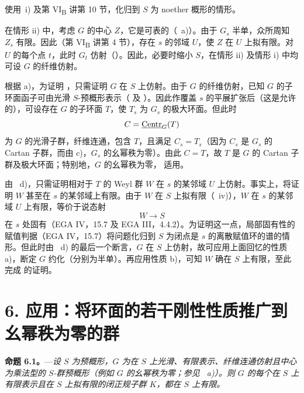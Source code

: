 使用~i) 及第 VI\textsubscript{B} 讲第 10 节，化归到 \(S\) 为 noether 概形的情形。

在情形 ii) 中，考虑 \(G\) 的中心 \(Z\)，它是可表的（~a)）。由于 \(G_s\) 半单，众所周知 \(Z_s\) 有限。因此（第 VI\textsubscript{B} 讲第 4 节），存在 \(s\) 的邻域 \(U\)，使 \(Z\) 在 \(U\) 上拟有限。对 \(U\) 的每个点 \(t\)，此时 \(G_t\) 仿射（）。因此，必要时缩小 \(S\)，在情形 ii) 及情形 i) 中均可设 \(G\) 的纤维仿射。

根据 a)，为证明 ，只需证明 \(G\) 在 \(S\) 上仿射。由于 \(G\) 的纤维仿射，已知 \(G\) 的子环面函子可由光滑 \(S\)-预概形表示（ 及 ）。因此作覆盖 \(s\) 的平展扩张后（这是允许的），可设存在 \(G\) 的子环面 \(T\)，使 \(T_s\) 为 \(G_s\) 的极大环面。但此时
\[
  C=\underline{\operatorname{Centr}}_G(T)
\]
为 \(G\) 的光滑子群，纤维连通，包含 \(T\)，且满足 \(C_s=T_s\)（因为 \(C_s\) 是 \(G_s\) 的 Cartan 子群，而由 c)，\(G_s\) 的幺幂秩为零）。由此 \(C=T\)，故 \(T\) 是 \(G\) 的 Cartan 子群及极大环面；特别地，\(G\) 的幺幂秩为零， 适用。

由 ~d)，只需证明相对于 \(T\) 的 Weyl 群 \(W\) 在 \(s\) 的某邻域 \(U\) 上仿射。事实上，将证明 \(W\) 甚至在 \(s\) 的某邻域上有限。由于 \(W\) 在 \(S\) 上拟有限（~iv)），\(W\) 在 \(s\) 的某邻域 \(U\) 上有限，等价于说态射
\[
  W\longrightarrow S
\]
在 \(s\) 处固有（EGA IV，15.7 及 EGA III，4.4.2）。为证明这一点，局部固有性的赋值判据（EGA IV，15.7）将问题化归到 \(S\) 为闭点是 \(s\) 的离散赋值环的谱的情形。但此时由 ~d) 的最后一个断言，\(G\) 在 \(S\) 上仿射，故可应用上面回忆的性质 a)，断定 \(G\) 约化（分别为半单）。再应用性质 b)，可知 \(W\) 确在 \(S\) 上有限，至此完成  的证明。

%
\section*{6. 应用：将环面的若干刚性性质推广到幺幂秩为零的群}

\noindent{}%
\textbf{命题 6.1。}---\textit{设 \(S\) 为预概形，\(G\) 为在 \(S\) 上光滑、有限表示、纤维连通仿射且中心为乘法型的 \(S\)-群预概形（例如 \(G\) 的幺幂秩为零；参见 ~a)）。则 \(G\) 的每个在 \(S\) 上有限表示且在 \(S\) 上拟有限的闭正规子群 \(K\)，都在 \(S\) 上有限。}

